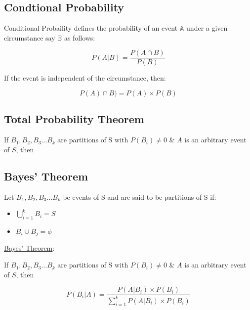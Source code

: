 \documentclass[./EngineeringMaths.tex]{subfiles}
\begin{document}
\subsection{Condtional Probability}
Conditional Probaility defines the probability of an event $\mathbb{A}$ under a given circumstance say $\mathbb{B}$ as follows:

\[P(A|B) = \frac{P(A\cap B)}{P(B)}\]

If the event is independent of the circumstance, then:

\[P(A)\cap B) = P(A) \times P(B)\]

\subsection*{Total Probability Theorem}

If $B_1,B_2,B_3\dots B_k$ are partitions of S with $P(B_i) \neq 0$ \& $A$ is an arbitrary event of $S$, then


\subsection{Bayes' Theorem}
Let $B_1,B_2,B_3\dots B_k$ be events of S and are said to be partitions of S if:

\begin{itemize}
\item $\bigcup\limits_{i=1}^k B_i = S$
\item $B_i \cup B_j = \phi$
\end{itemize}

\underline{Bayes' Theorem}: 

If $B_1,B_2,B_3\dots B_k$ are partitions of S with $P(B_i) \neq 0$ \& $A$ is an arbitrary event of $S$, then

\begin{equation*}
P(B_i|A) = \frac{P(A|B_i)\times P(B_i)}{\sum\limits_{i=1}^k P(A|B_i)\times P(B_i)}
\end{equation*}
\end{document}
